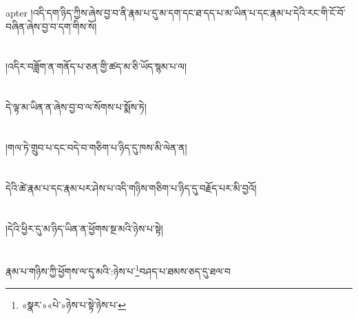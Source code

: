 apter{ }།འདི་དག་ཉིད་ཀྱིས་ཞེས་བྱ་བ་ནི་རྣམ་པ་དུ་མ་དག་དང་ཐ་དད་པ་མ་ཡིན་པ་དང་རྣམ་པ་དེའི་རང་གི་ངོ་བོ་བཞིན་ཞེས་བྱ་བ་དག་གིས་སོ།\chapter{ }།འདིར་བཟློག་ན་གནོད་པ་ཅན་གྱི་ཚད་མ་ཅི་ཡོད་སྙམ་པ་ལ།\chapter{ }དེ་ལྟ་མ་ཡིན་ན་ཞེས་བྱ་བ་ལ་སོགས་པ་སྨོས་ཏེ།\chapter{ }།གལ་ཏེ་གྲུབ་པ་དང་བདེ་བ་གཅིག་པ་ཉིད་དུ་ཁས་མི་ལེན་ན།\chapter{ }དེའི་ཚེ་རྣམ་པ་དང་རྣམ་པར་ཤེས་པ་འདི་གཉིས་གཅིག་པ་ཉིད་དུ་བརྗོད་པར་མི་བྱའོ།\chapter{ }།དེའི་ཕྱིར་དུ་མ་ཉིད་ཡིན་ན་ཕྱོགས་སྔ་མའི་ཉེས་པ་སྟེ།\chapter{ }རྣམ་པ་གཉིས་ཀྱི་ཕྱོགས་ལ་དུ་མའི་:ཉེས་པ་\footnote{«སྣར་»«པེ་»ཉེས་པ་སྟེ་ཉེས་པ་}བཤད་པ་ཐམས་ཅད་དུ་ཐལ་བ